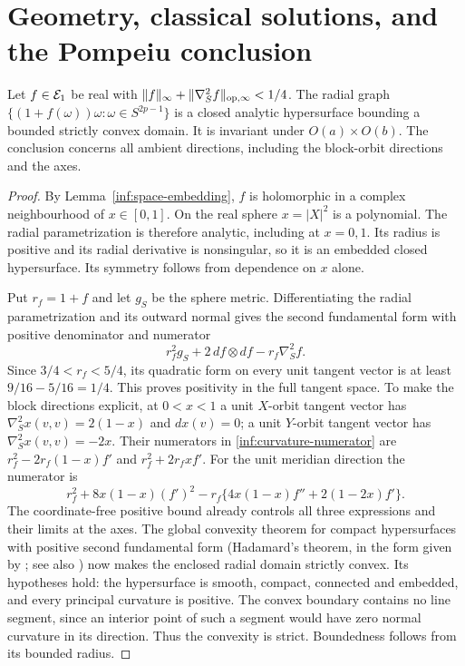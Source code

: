 \section{Geometry, classical solutions, and the Pompeiu conclusion}
\label{inf:sec-geometry}

\begin{lemma}
\label{inf:geometry-convexity}
Let $f\in\mathcal E_1$ be real with
$\lVert f\rVert_\infty+\lVert \nabla_S^2f\rVert_{\mathrm{op},\infty}<1/4$.
The radial graph $\{(1+f(\omega))\omega:\omega\in S^{2p-1}\}$
is a closed analytic hypersurface bounding a bounded strictly
convex domain. It is invariant under $O(a)\times O(b)$.
The conclusion concerns all ambient directions, including the
block-orbit directions and the axes.
\end{lemma}
\begin{proof}
By Lemma~\ref{inf:space-embedding}, $f$ is holomorphic in a
complex neighbourhood of $x\in[0,1]$. On the real sphere
$x=|X|^2$ is a polynomial. The radial parametrization is therefore
analytic, including at $x=0,1$. Its radius is positive and its
radial derivative is nonsingular, so it is an embedded closed
hypersurface. Its symmetry follows from dependence on $x$ alone.

Put $r_f=1+f$ and let $g_S$ be the sphere metric.
Differentiating the radial parametrization and its outward normal
gives the second fundamental form with positive denominator and
numerator
\begin{equation}\label{inf:curvature-numerator}
 r_f^2g_S+2\,df\otimes df-r_f\nabla_S^2f.
\end{equation}
Since $3/4<r_f<5/4$, its quadratic form on every unit tangent
vector is at least $9/16-5/16=1/4$.
This proves positivity in the full tangent space.
To make the block directions explicit, at $0<x<1$ a unit
$X$-orbit tangent vector has
$\nabla_S^2x(v,v)=2(1-x)$ and $dx(v)=0$; a unit $Y$-orbit
tangent vector has $\nabla_S^2x(v,v)=-2x$.
Their numerators in \eqref{inf:curvature-numerator} are
$r_f^2-2r_f(1-x)f'$ and $r_f^2+2r_fx f'$.
For the unit meridian direction the numerator is
\[
 r_f^2+8x(1-x)(f')^2
   -r_f\{4x(1-x)f''+2(1-2x)f'\}.
\]
The coordinate-free positive bound already controls all three
expressions and their limits at the axes.
The global convexity theorem for compact hypersurfaces with
positive second fundamental form (Hadamard's theorem, in the form
given by \cite{inf:doCarmoLima}; see also \cite{inf:sacksteder})
now makes the enclosed radial domain
strictly convex. Its hypotheses hold: the hypersurface is smooth,
compact, connected and embedded, and every principal curvature
is positive. The convex boundary contains no line segment, since
an interior point of such a segment would have zero normal
curvature in its direction. Thus the convexity is strict.
Boundedness follows from its bounded radius.
\end{proof}

